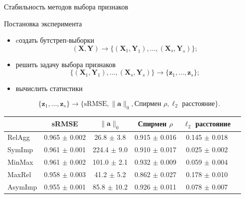 \documentclass[10pt]{beamer}
\newcommand{\ba}{\mathbf{a}}
\newcommand{\bz}{\mathbf{z}}
\newcommand{\bX}{\mathbf{X}}
\newcommand{\bY}{\mathbf{Y}}
\begin{document}
\begin{frame}{Стабильность методов выбора признаков}
\begin{block}{Постановка эксперимента}
	\begin{itemize}
	\item cоздать бутстреп-выборки
	\vspace{-0.1cm}
	\[
		(\bX, \bY) \rightarrow \bigl\{(\bX_1, \bY_1), \dots, (\bX_s, \bY_s)\bigr\};
	\]
	\item решить задачу выбора признаков
	\vspace{-0.1cm}
	\[
		 \bigl\{(\bX_1, \bY_1), \dots, (\bX_s, \bY_s)\bigr\}  \rightarrow \{\bz_1, \dots, \bz_s\};
	\]
	\item вычислить статистики
	\vspace{-0.1cm}
	\end{itemize}
	\[
		\{\bz_1, \dots, \bz_s\} \rightarrow \{ \text{sRMSE}, \|\ba\|_0, \text{Спирмен }\rho, \ell_2 \text{ расстояние}\}.
	\]
\end{block}
\renewcommand{\arraystretch}{1.2}
\begin{table}[]
	\centering
	\begin{tabular}{l|ccccc}
		\hline
		& sRMSE  & $\|\ba\|_0$ & Спирмен $\rho$ & $\ell_2$ расстояние \\ \hline
		RelAgg & 0.965 $\pm$ 0.002 & 26.8 $\pm$ 3.8 & 0.915 $\pm$ 0.016 & 0.145 $\pm$ 0.018   \\
		SymImp & 0.961 $\pm$ 0.001 & 224.4 $\pm$ 9.0 & 0.910 $\pm$ 0.017 & 0.025 $\pm$ 0.002   \\
		MinMax & 0.961 $\pm$ 0.002 & 101.0 $\pm$ 2.1& 0.932 $\pm$ 0.009 & 0.059 $\pm$ 0.004   \\
		MaxRel & 0.958 $\pm$ 0.003 & 41.2 $\pm$ 5.2 & 0.862 $\pm$ 0.027 & 0.178 $\pm$ 0.010   \\
		AsymImp & 0.955 $\pm$ 0.001 & 85.8 $\pm$ 10.2& 0.926 $\pm$ 0.011 & 0.078 $\pm$ 0.007  \\ \hline
	\end{tabular}
\end{table}
\end{frame}
\end{document}

